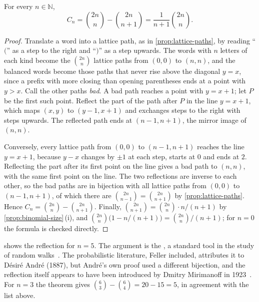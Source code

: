 \begin{theorem}
\label{thm:catalan}
For every $n\in\mathbb N$,
\[
C_n=\binom{2n}{n}-\binom{2n}{n+1}=\frac1{n+1}\binom{2n}{n}.
\]
\end{theorem}

\begin{proof}
Translate a word into a lattice path, as in \cref{prop:lattice-paths}, by reading ``$($'' as a step to the right and ``$)$'' as a step upwards. The words with $n$ letters of each kind become the $\binom{2n}{n}$ lattice paths from $(0,0)$ to $(n,n)$, and the balanced words become those paths that never rise above the diagonal $y=x$, since a prefix with more closing than opening parentheses ends at a point with $y>x$. Call the other paths \emph{bad}. A bad path reaches a point with $y=x+1$; let $P$ be the first such point. Reflect the part of the path after $P$ in the line $y=x+1$, which maps $(x,y)$ to $(y-1,x+1)$ and exchanges steps to the right with steps upwards. The reflected path ends at $(n-1,n+1)$, the mirror image of $(n,n)$.

Conversely, every lattice path from $(0,0)$ to $(n-1,n+1)$ reaches the line $y=x+1$, because $y-x$ changes by $\pm1$ at each step, starts at $0$ and ends at $2$. Reflecting the part after its first point on the line gives a bad path to $(n,n)$, with the same first point on the line. The two reflections are inverse to each other, so the bad paths are in bijection with all lattice paths from $(0,0)$ to $(n-1,n+1)$, of which there are $\binom{2n}{n-1}=\binom{2n}{n+1}$ by \cref{prop:lattice-paths}. Hence $C_n=\binom{2n}{n}-\binom{2n}{n+1}$. Finally, $\binom{2n}{n+1}=\binom{2n}{n}\cdot n/(n+1)$ by \cref{prop:binomial-size}\,(i), and $\binom{2n}{n}\bigl(1-n/(n+1)\bigr)=\binom{2n}{n}/(n+1)$; for $n=0$ the formula is checked directly.
\end{proof}

 shows the reflection for $n=5$. The argument is the , a standard tool in the study of random walks~\cite{feller1968}. The probabilistic literature, Feller included, attributes it to D\'esir\'e Andr\'e (1887), but Andr\'e's own proof used a different bijection, and the reflection itself appears to have been introduced by Dmitry Mirimanoff in 1923~\cite{stanley2015catalan}. For $n=3$ the theorem gives $\binom63-\binom64=20-15=5$, in agreement with the list above.

